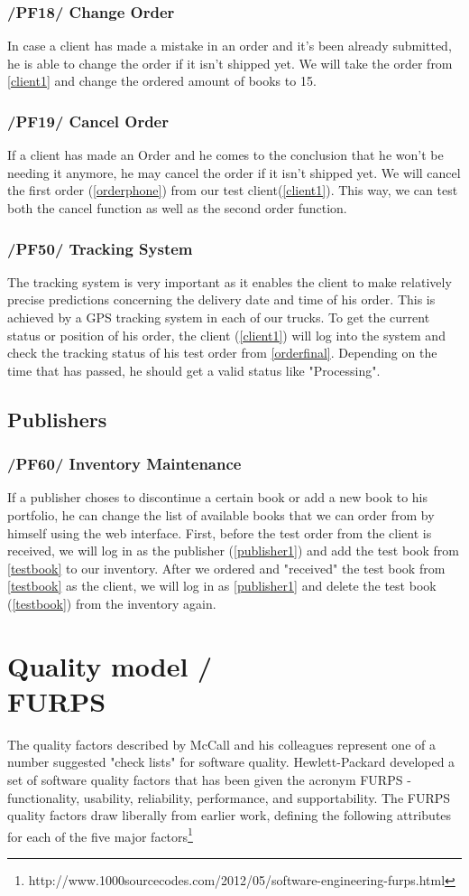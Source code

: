 \documentclass[11pt,a4paper,oneside,svgnames]{report}
\begin{document}
\subsection{/PF18/ Change Order}
In case a client has made a mistake in an order and it's been already submitted, he is able to change the order if it isn't shipped yet. We will take the order from \ref{client1} and change the ordered amount of books to 15.
\subsection{/PF19/ Cancel Order}
\label{cancel}
If a client has made an Order and he comes to the conclusion that he won't be needing it anymore, he may cancel the order if it isn't shipped yet. We will cancel the first order (\ref{orderphone}) from our test client(\ref{client1}). This way, we can test both the cancel function as well as the second order function.
\subsection{/PF50/ Tracking System}
The tracking system is very important as it enables the client to make relatively precise predictions concerning the delivery date and time of his order. This is achieved by a GPS tracking system in each of our trucks. To get the current status or position of his order, the client (\ref{client1}) will log into the system and check the tracking status of his test order from \ref{orderfinal}. Depending on the time that has passed, he should get a valid status like "Processing".
\section{Publishers}
\subsection{/PF60/ Inventory Maintenance}
If a publisher choses to discontinue a certain book or add a new book to his portfolio, he can change the list of available books that we can order from by himself using the web interface. First, before the test order from the client is received, we will log in as the publisher (\ref{publisher1}) and add the test book from \ref{testbook} to our inventory.  After we ordered and "received" the test book from \ref{testbook} as the client, we will log in as \ref{publisher1} and delete the test book (\ref{testbook}) from the inventory again.

\chapter{Quality model /\\FURPS}
The quality factors described by McCall and his colleagues represent one of a number suggested "check lists" for software quality. Hewlett-Packard developed a set of software quality factors that has been given the acronym FURPS - functionality, usability, reliability, performance, and supportability. The FURPS quality factors draw liberally from earlier work, defining the following attributes for each of the five major factors\footnote{http://www.1000sourcecodes.com/2012/05/software-engineering-furps.html}
\end{document}
